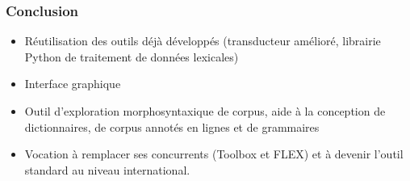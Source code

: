 \documentclass[xcolor=table]{beamer}
\begin{document}
 \begin{frame} 
 \frametitle{Conclusion}  
\begin{itemize}
\item Réutilisation des outils déjà développés (transducteur amélioré, librairie Python de traitement de données lexicales)
\item Interface graphique
\item Outil d'exploration morphosyntaxique de corpus, aide à la conception de dictionnaires, de corpus annotés en lignes et de grammaires

\item Vocation à remplacer ses concurrents (Toolbox et FLEX) et à devenir l'outil standard au niveau international.
\end{itemize} 
 
\end{frame}   
\end{document}
